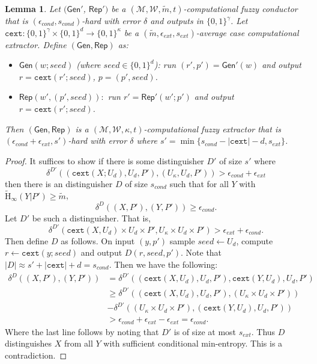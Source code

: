 \documentclass[11pt]{article}
\newtheorem{lemma}[theorem]{Lemma}
\newcommand{\class}[1]{{\ensuremath{\mathsf{#1}}}}
\newcommand{\gen}{\ensuremath{\class{Gen}}\xspace}
\newcommand{\rep}{\ensuremath{\class{Rep}}\xspace}
\newcommand{\zo}{\ensuremath{\{0, 1\}}}
\newcommand{\Hav}{\tilde{\mathrm{H}}_\infty}
\newcommand{\cext}{\ensuremath{\mathtt{cext}}}
\begin{document}
\begin{lemma}
\label{lem:cond and cext}
Let $(\gen'$, $\rep')$ be a $(\mathcal{M}, \mathcal{W}, \tilde{m}, t)$-computational fuzzy conductor that is $(\epsilon_{cond}, s_{cond})$-hard with error $\delta$ and outputs in $\zo^\gamma$.  Let $\cext:\zo^\gamma\times \zo^d\rightarrow \zo^\kappa$ be a $(\tilde{m}, \epsilon_{ext}, s_{ext})$-average case computational extractor.  Define $(\gen, \rep)$ as:
\begin{itemize}
\item $\gen(w; seed)$ (where $seed\in \zo^d$): run $(r', p')= \gen'(w)$ and output $r = \cext(r'; seed)$, $p = (p', seed)$.
\item $\rep(w', (p', seed)):$ run $r' = \rep'(w'; p')$ and output $r = \cext(r'; seed)$.
\end{itemize}
Then $(\gen, \rep)$ is a $(\mathcal{M}, \mathcal{W}, \kappa, t)$-computational fuzzy extractor that is $(\epsilon_{cond}+\epsilon_{ext}, s')$-hard with error $\delta$ where $s' = \min\{s_{cond} - |\cext| -d, s_{ext}\}$.
\end{lemma}

\begin{proof}
It suffices to show if there is some distinguisher $D'$ of size $s'$ where
\[\delta^{D'}((\cext(X; U_d), U_d, P'), (U_\kappa, U_d, P'))>\epsilon_{cond}+ \epsilon_{ext}\]
 then there is an distinguisher $D$ of size $s_{cond}$ such that for all $Y$ with $\Hav(Y|P') \geq \tilde{m}$,
 \[
 \delta^{D}((X,P'), (Y, P'))\geq \epsilon_{cond}.
 \]
Let $D'$ be such a distinguisher.  That is,
\[
\delta^{D'}(\cext(X, U_d)\times U_d \times P', U_\kappa\times U_d\times P')> \epsilon_{ext}+\epsilon_{cond}.
\]
Then define $D$ as follows.  On input $(y, p')$ sample $seed\leftarrow U_d$, compute $r\leftarrow \cext(y; seed)$ and output $D(r, seed, p')$.  Note that $|D| \approx s' + |\cext| +d= s_{cond}$.  Then we have the following:
\begin{align*}
\delta^{D}((X, P'), (Y, P'))&= \delta^{D'}((\cext(X, U_d), U_d, P'), \cext(Y, U_d), U_d, P')\\
&\geq \delta^{D'}((\cext(X, U_d), U_d, P'), (U_\kappa\times U_d \times P')) \\
&- \delta^{D'}((U_\kappa\times U_d \times P'), (\cext(Y, U_d), U_d, P'))\\
&>\epsilon_{cond}+\epsilon_{ext}- \epsilon_{ext} = \epsilon_{cond}.
\end{align*}
Where the last line follows by noting that $D'$ is of size at most $s_{ext}$.  Thus $D$ distinguishes $X$ from all $Y$ with sufficient conditional min-entropy.  This is a contradiction.
\end{proof}
\end{document}
